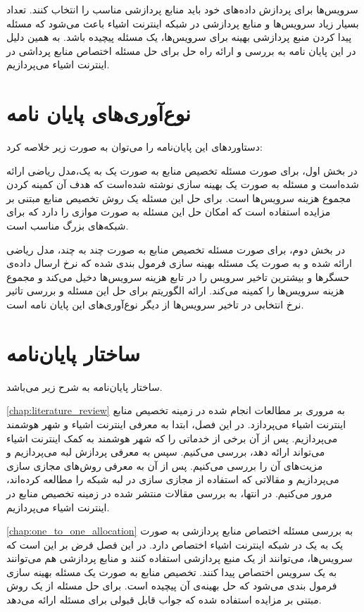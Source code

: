     سرویس‌ها برای پردازش داده‌های خود باید منابع پردازشی مناسب را انتخاب کنند.
    تعداد بسیار زیاد سرویس‌ها و منابع پردازشی در شبکه اینترنت اشیاء باعث می‌شود که مسئله پیدا کردن منبع پردازشی بهینه برای سرویس‌ها، یک مسئله پیچیده باشد.
    به همین دلیل در این پایان نامه به بررسی و ارائه راه حل برای حل مسئله اختصاص منابع پرداشی در اینترنت اشیاء می‌پردازیم.

  \section{نوع‌آوری‌های پایان نامه}
    دستاورد‌های این پایان‌نامه را می‌توان به صورت زیر خلاصه کرد:

    در بخش اول، برای صورت مسئله تخصیص منابع به صورت یک به یک،مدل ریاضی ارائه شده‌است و مسئله به صورت یک بهینه سازی نوشته شده‌است که هدف آن کمینه کردن مجموع هزینه سرویس‌ها است. برای حل این مسئله یک روش تخصیص منابع مبتنی بر مزایده استفاده است که امکان حل این مسئله به صورت موازی را دارد که برای شبکه‌های بزرگ مناسب است.

    در بخش دوم، برای صورت مسئله تخصیص منابع به صورت چند به چند، مدل ریاضی ارائه شده و به صورت یک مسئله بهینه سازی فرمول بندی شده که نرخ ارسال داده‌ی حسگر‌ها و بیشترین تاخیر سرویس را در تابع هزینه سرویس‌ها دخیل می‌کند و مجموع هزینه سرویس‌ها را کمینه می‌کند.
    ارائه الگوریتم برای حل این مسئله و بررسی تاثیر نرخ انتخابی در تاخیر سرویس‌ها از دیگر نوع‌آوری‌های این پایان نامه است.

  \section{ساختار پایان‌نامه}
    ساختار پایان‌نامه به شرح زیر می‌باشد.

    \cref{chap:literature_review} به مروری بر مطالعات انجام شده در زمینه تخصیص منابع اینترنت اشیاء می‌پردازد.
    در این فصل، ابتدا به معرفی اینترنت اشیاء و شهر هوشمند می‌پردازیم.
    پس از آن برخی از خدماتی را که شهر هوشمند به کمک اینترنت اشیاء می‌تواند ارائه دهد، بررسی می‌کنیم.
    سپس به معرفی پردازش لبه می‌پردازیم و مزیت‌های آن را بررسی می‌کنیم.
    پس از آن به معرفی روش‌های مجازی سازی می‌پردازیم و مقالاتی که استفاده از مجازی سازی در لبه شبکه را مطالعه کرده‌اند، مرور می‌کنیم.
    در انتها، به بررسی مقالات منتشر شده در زمینه تخصیص منابع در اینترنت اشیاء می‌پردازیم.

    \cref{chap:one_to_one_allocation} به بررسی مسئله اختصاص منابع پردازشی به صورت یک به یک در شبکه اینترنت اشیاء اختصاص دارد.
    در این فصل فرض بر این است که سرویس‌ها، می‌توانند از یک منبع پردازشی استفاده کنند و منابع پردازشی هم می‌توانند به یک سرویس اختصاص پیدا کنند.
    تخصیص منابع به صورت یک مسئله بهینه سازی فرمول بندی می‌شود که حل بهینه‌ی آن پیچیده است.
    برای حل مسئله از یک روش مبتنی بر مزایده استفاده شده که جواب قابل قبولی برای مسئله ارائه می‌دهد.

